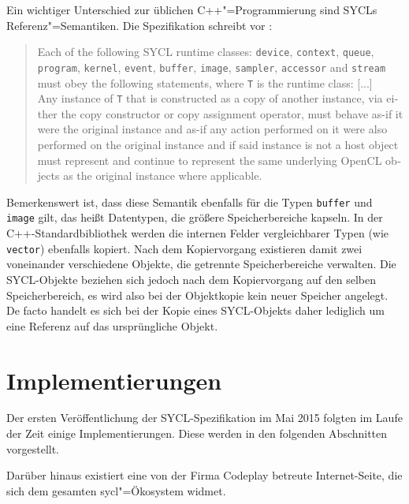 Ein wichtiger Unterschied zur üblichen C++"=Programmierung sind SYCLs
Referenz"=Semantiken. Die Spezifikation schreibt vor
\cite[siehe][Abschnitt 4.3.2]{sycl2019}:
\begin{otherlanguage}{english}
    \begin{quote}
        Each of the following SYCL runtime classes: \texttt{device},
        \texttt{context}, \texttt{queue}, \texttt{program}, \texttt{kernel},
        \texttt{event}, \texttt{buffer}, \texttt{image}, \texttt{sampler},
        \texttt{accessor} and \texttt{stream} must obey the following
        statements, where \texttt{T} is the runtime class: [...]
        \\
        Any instance of \texttt{T} that is constructed as a copy of another
        instance, via either the copy constructor or copy assignment operator,
        must behave as-if it were the original instance and as-if any action
        performed on it were also performed on the original instance and if said
        instance is not a host object must represent and continue to represent
        the same underlying OpenCL objects as the original instance where
        applicable.
    \end{quote}
\end{otherlanguage}
Bemerkenswert ist, dass diese Semantik ebenfalls für die Typen \texttt{buffer}
und \texttt{image} gilt, das heißt Datentypen, die größere Speicherbereiche
kapseln. In der C++-Standardbibliothek werden die internen Felder vergleichbarer
Typen (wie \texttt{vector}) ebenfalls kopiert. Nach dem Kopiervorgang existieren
damit zwei voneinander verschiedene Objekte, die getrennte Speicherbereiche
verwalten. Die SYCL-Objekte beziehen sich jedoch nach dem Kopiervorgang auf den
selben Speicherbereich, es wird also bei der Objektkopie kein neuer Speicher
angelegt. De facto handelt es sich bei der Kopie eines SYCL-Objekts daher
lediglich um eine Referenz auf das ursprüngliche Objekt.

\section{Implementierungen}\label{sycl:implementierungen}

Der ersten Veröffentlichung der SYCL-Spezifikation im Mai 2015 folgten im Laufe
der Zeit einige Implementierungen. Diese werden in den folgenden Abschnitten
vorgestellt.

Darüber hinaus existiert eine von der Firma Codeplay betreute Internet-Seite,
die sich dem gesamten \gls{sycl}"=Ökosystem widmet. \cite[vgl.][]{sycltech}

